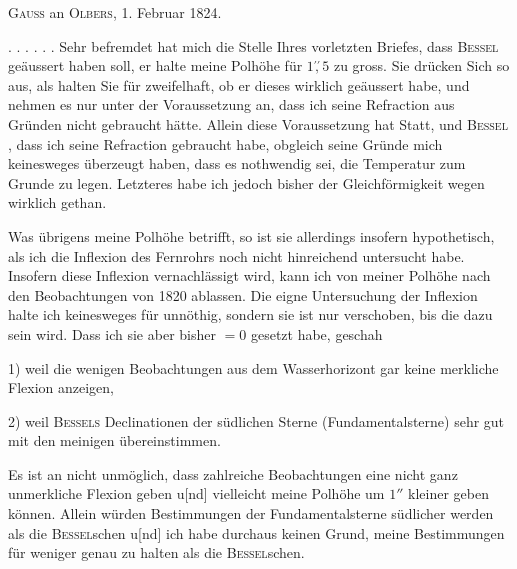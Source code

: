 \clearpage\begingroup
\hypertarget{native-338b}{}
\begin{center}\textsc{Gauss} an \textsc{Olbers}, 1. Februar 1824.\end{center}
\noindent\hspace*{\parindent}. . . . . . Sehr befremdet hat mich die Stelle Ihres vorletzten Briefes, dass \textsc{Bessel} geäussert haben soll, er halte meine Polhöhe für \(1\overset{\prime\prime}{,}5\) zu gross. Sie drücken Sich so aus, als halten Sie für zweifelhaft, ob er dieses wirklich geäussert habe, und nehmen es nur unter der Voraussetzung an, dass ich seine Refraction aus Gründen nicht gebraucht hätte. Allein diese Voraussetzung hat  Statt, und \textsc{Bessel} , dass ich seine Refraction
\clearpage{}
\noindent gebraucht habe, obgleich seine Gründe mich keinesweges überzeugt haben, dass es nothwendig sei, die  Temperatur zum Grunde zu legen. Letzteres habe ich jedoch bisher der Gleichförmigkeit wegen wirklich gethan.

Was übrigens meine Polhöhe betrifft, so ist sie allerdings insofern hypothetisch, als ich die Inflexion des Fernrohrs noch nicht hinreichend untersucht habe. Insofern diese Inflexion vernachlässigt wird, kann ich von meiner Polhöhe nach den Beobachtungen von 1820  ablassen. Die eigne Untersuchung der Inflexion halte ich keinesweges für unnöthig, sondern sie ist nur verschoben, bis die  dazu sein wird. Dass ich sie aber bisher \(=0\) gesetzt habe, geschah
\par\noindent\hspace*{\parindent}1) weil die wenigen Beobachtungen aus dem Wasserhorizont gar keine merkliche Flexion anzeigen,
\par\noindent\hspace*{\parindent}2) weil \textsc{Bessels} Declinationen der südlichen Sterne (Fundamentalsterne) sehr gut mit den meinigen übereinstimmen.

Es ist an  nicht unmöglich, dass zahlreiche Beobachtungen eine nicht ganz unmerkliche Flexion geben u[nd] vielleicht meine Polhöhe um \(1''\) kleiner geben können. Allein  würden  Bestimmungen der Fundamentalsterne südlicher werden als die \textsc{Bessel}schen u[nd] ich habe durchaus keinen Grund, meine Bestimmungen für weniger genau zu halten als die \textsc{Bessel}schen.

